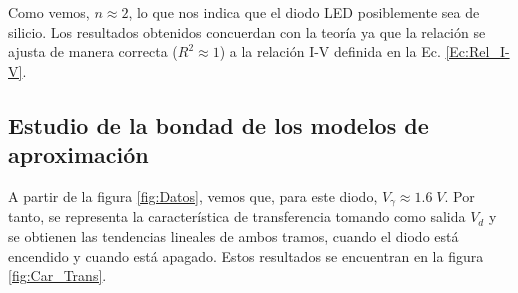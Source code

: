Como vemos, $n\approx 2$, lo que nos indica que el diodo LED posiblemente sea de silicio. Los resultados obtenidos concuerdan con la teoría ya que la relación se ajusta de manera correcta ($R^2\approx 1$) a la relación I-V definida en la Ec. \ref{Ec:Rel_I-V}.

\subsection{Estudio de la bondad de los modelos de aproximación}
A partir de la figura \ref{fig:Datos}, vemos que, para este diodo, $V_\gamma \approx 1.6\;V$. Por tanto, se representa la característica de transferencia tomando como salida $V_d$ y se obtienen las tendencias lineales de ambos tramos, cuando el diodo está encendido y cuando está apagado. Estos resultados se encuentran en la figura \ref{fig:Car_Trans}.

